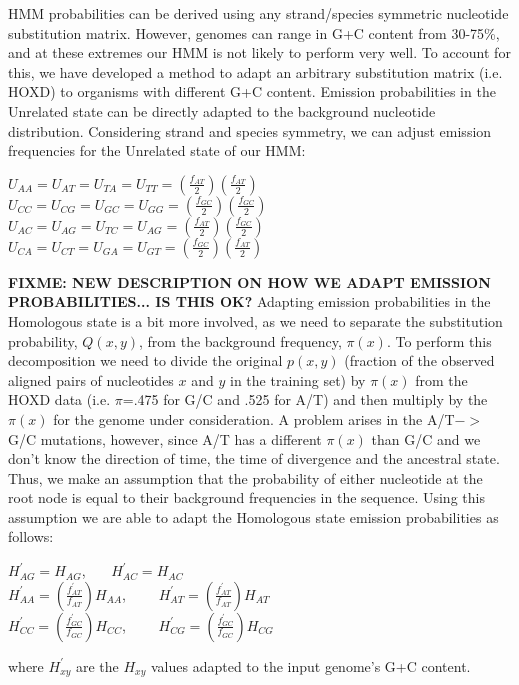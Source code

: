 \documentclass{llncs}
\begin{document}
HMM probabilities can be derived using any strand/species symmetric nucleotide substitution matrix. However,
genomes can range in G+C content from 30-75\%, and at these extremes
our HMM is not likely to perform very well.  To account for this, we
have developed a method to adapt an arbitrary substitution matrix
(i.e. HOXD) to organisms with different G+C content.  Emission
probabilities in the Unrelated state can be directly adapted to the
background nucleotide distribution.  Considering strand and species
symmetry, we can adjust emission frequencies for the Unrelated state
of our HMM:
\begin{center}
$U_{AA}=U_{AT}=U_{TA}=U_{TT}=(\frac{f_{AT}}{2})(\frac{f_{AT}}{2})$
$U_{CC}=U_{CG}=U_{GC}=U_{GG}=(\frac{f_{GC}}{2})(\frac{f_{GC}}{2})$
$U_{AC}=U_{AG}=U_{TC}=U_{AG}=(\frac{f_{AT}}{2})(\frac{f_{GC}}{2})$
$U_{CA}=U_{CT}=U_{GA}=U_{GT}=(\frac{f_{GC}}{2})(\frac{f_{AT}}{2})$
\end{center}

\textbf{FIXME: NEW DESCRIPTION ON HOW WE ADAPT EMISSION PROBABILITIES... IS THIS OK?}
Adapting emission probabilities in the Homologous state is a bit more
involved, as we need to separate the substitution probability,
$Q(x,y)$, from the background frequency, $\pi(x)$.  To perform this
decomposition we need to divide the original $p(x,y)$ (fraction of the
observed aligned pairs of nucleotides $x$ and $y$ in the training set)
by $\pi(x)$ from the HOXD data (i.e. $\pi$=.475 for G/C and .525 for
A/T) and then multiply by the $\pi(x)$ for the genome under
consideration. A problem arises in the A/T$->$G/C mutations, however,
since A/T has a different $\pi(x)$ than G/C and we don't know the
direction of time, the time of divergence and the ancestral
state. Thus, we make an assumption that the probability of either
nucleotide at the root node is equal to their background frequencies
in the sequence. Using this assumption we are able to adapt the
Homologous state emission probabilities as follows:
\begin{center}
$H^{'}_{AG}=H_{AG}$, \ \ \ $H^{'}_{AC}=H_{AC}$ \\
$H^{'}_{AA}=(\frac{f^{'}_{AT}}{f_{AT}})H_{AA}$, \ \ \ \
$H^{'}_{AT}=(\frac{f^{'}_{AT}}{f_{AT}})H_{AT}$\\
$H^{'}_{CC}=(\frac{f^{'}_{GC}}{f_{GC}})H_{CC}$, \ \ \ \
$H^{'}_{CG}=(\frac{f^{'}_{GC}}{f_{GC}})H_{CG}$\\
\end{center}
where $H^{'}_{xy}$ are the $H_{xy}$ values adapted to the input genome's G+C content.
\end{document}
